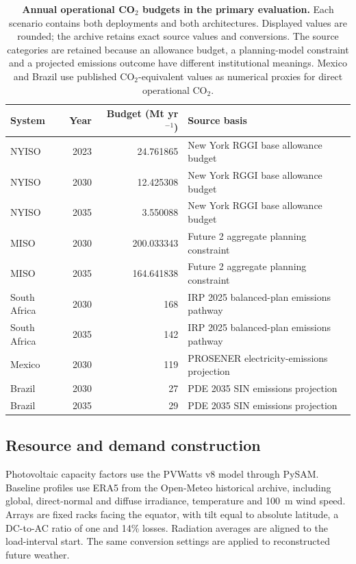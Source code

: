 \documentclass[pdflatex,sn-nature]{sn-jnl}
\begin{document}
\begin{table}[tbp]
\caption{\textbf{Annual operational CO$_2$ budgets in the primary evaluation.} Each scenario contains both deployments and both architectures. Displayed values are rounded; the archive retains exact source values and conversions. The source categories are retained because an allowance budget, a planning-model constraint and a projected emissions outcome have different institutional meanings. Mexico and Brazil use published CO$_2$-equivalent values as numerical proxies for direct operational CO$_2$.}
\label{tab:carbon-scenarios}
\centering\small
\begin{tabularx}{\textwidth}{@{}lrr>{\raggedright\arraybackslash}X@{}}
\toprule
System & Year & Budget (Mt yr$^{-1}$) & Source basis \\
\midrule
NYISO & 2023 & 24.761865 & New York RGGI base allowance budget \\
NYISO & 2030 & 12.425308 & New York RGGI base allowance budget \\
NYISO & 2035 & 3.550088 & New York RGGI base allowance budget \\
MISO & 2030 & 200.033343 & Future 2 aggregate planning constraint \\
MISO & 2035 & 164.641838 & Future 2 aggregate planning constraint \\
South Africa & 2030 & 168 & IRP 2025 balanced-plan emissions pathway \\
South Africa & 2035 & 142 & IRP 2025 balanced-plan emissions pathway \\
Mexico & 2030 & 119 & PROSENER electricity-emissions projection \\
Brazil & 2030 & 27 & PDE 2035 SIN emissions projection \\
Brazil & 2035 & 29 & PDE 2035 SIN emissions projection \\
\bottomrule
\end{tabularx}
\end{table}

\subsection{Resource and demand construction}

Photovoltaic capacity factors use the PVWatts v8 model through PySAM\cite{pvwattsv8,pysampvwattsv8}. Baseline profiles use ERA5 from the Open-Meteo historical archive, including global, direct-normal and diffuse irradiance, temperature and 100~m wind speed\cite{era5,openmeteo}. Arrays are fixed racks facing the equator, with tilt equal to absolute latitude, a DC-to-AC ratio of one and 14\% losses. Radiation averages are aligned to the load-interval start. The same conversion settings are applied to reconstructed future weather.
\end{document}
